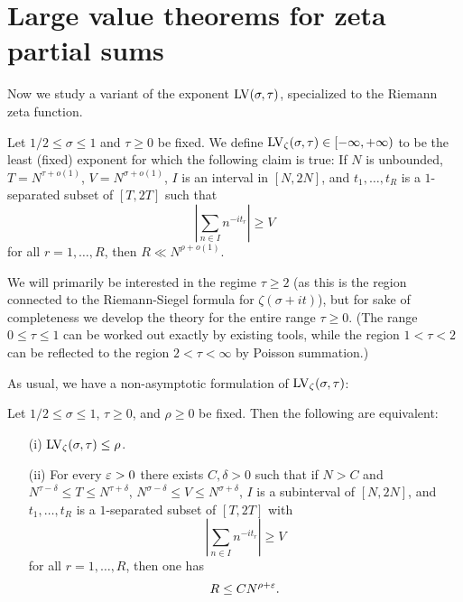 \chapter{Large value theorems for zeta partial sums}

Now we study a variant of the exponent $\mathrm{LV}(\sigma,\tau)$, specialized to the Riemann zeta function.

\begin{definition}\label{lvz-def} Let $1/2 \leq \sigma \leq 1$ and $\tau \geq 0$ be fixed. We define $\mathrm{LV}_\zeta(\sigma,\tau) \in [-\infty, +\infty)$ to be the least (fixed) exponent for which the following claim is true:
    If $N$ is unbounded, $T = N^{\tau+o(1)}$, $V = N^{\sigma+o(1)}$, $I$ is an interval in $[N,2N]$, and $t_1,\dots,t_R$ is a $1$-separated subset of $[T,2T]$ such that
    $$  |\sum_{n \in I} n^{-it_r}| \geq V$$
    for all $r=1,\dots,R$, then $R \ll N^{\rho+o(1)}$.
\end{definition}


We will primarily be interested in the regime $\tau \geq 2$ (as this is the region connected to the Riemann-Siegel formula for $\zeta(\sigma+it)$), but for sake of completeness we develop the theory for the entire range $\tau \geq 0$.  (The range $0 \leq \tau \leq 1$ can be worked out exactly by existing tools, while the region $1 < \tau < 2$ can be reflected to the region $2 < \tau < \infty$ by Poisson summation.)

As usual, we have a non-asymptotic formulation of $\mathrm{LV}_\zeta(\sigma,\tau)$:

\begin{lemma}\label{lvz-asymp} Let $1/2 \leq \sigma \leq 1$, $\tau \geq 0$, and $\rho \geq 0$  be fixed.  Then the following are equivalent:
    \begin{itemize}
    \item[(i)] $\mathrm{LV}_\zeta(\sigma,\tau) \leq \rho$.
    \item[(ii)] For every $\varepsilon>0$ there exists $C,\delta>0$ such that if $N > C$ and $N^{\tau-\delta} \leq T \leq N^{\tau+\delta}$, $N^{\sigma-\delta} \leq V \leq N^{\sigma+\delta}$, $I$ is a subinterval of $[N,2N]$, and $t_1,\dots,t_R$ is a $1$-separated subset of $[T,2T]$ with
    $$ |\sum_{n \in I} n^{-it_r}| \geq V$$
    for all $r=1,\dots,R$, then one has
    $$ R \leq C N^{\rho+\varepsilon}.$$
    \end{itemize}
\end{lemma}

